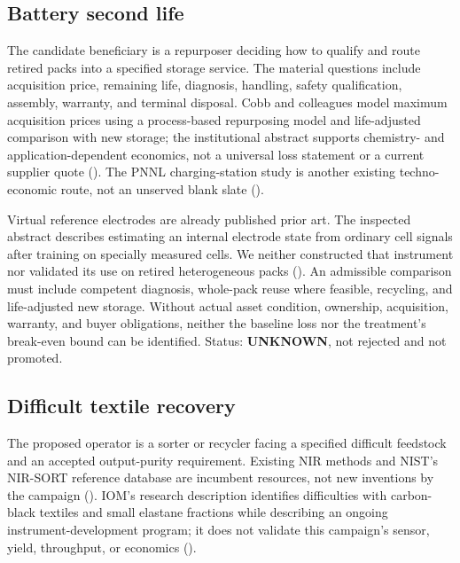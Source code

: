 \subsection{Battery second life}\label{battery-second-life}

The candidate beneficiary is a repurposer deciding how to qualify and
route retired packs into a specified storage service. The material
questions include acquisition price, remaining life, diagnosis,
handling, safety qualification, assembly, warranty, and terminal
disposal. Cobb and colleagues model maximum acquisition prices using a
process-based repurposing model and life-adjusted comparison with new
storage; the institutional abstract supports chemistry- and
application-dependent economics, not a universal loss statement or a
current supplier quote (). The PNNL
charging-station study is another existing techno-economic route, not an
unserved blank slate ().

Virtual reference electrodes are already published prior art. The
inspected abstract describes estimating an internal electrode state from
ordinary cell signals after training on specially measured cells. We
neither constructed that instrument nor validated its use on retired
heterogeneous packs (). An
admissible comparison must include competent diagnosis, whole-pack reuse
where feasible, recycling, and life-adjusted new storage. Without actual
asset condition, ownership, acquisition, warranty, and buyer
obligations, neither the baseline loss nor the treatment's break-even
bound can be identified. Status: \textbf{UNKNOWN}, not rejected and not
promoted.

\subsection{Difficult textile
recovery}\label{difficult-textile-recovery}

The proposed operator is a sorter or recycler facing a specified
difficult feedstock and an accepted output-purity requirement. Existing
NIR methods and NIST's NIR-SORT reference database are incumbent
resources, not new inventions by the campaign
(). IOM's research description identifies difficulties with
carbon-black textiles and small elastane fractions while describing an
ongoing instrument-development program; it does not validate this
campaign's sensor, yield, throughput, or economics
().

